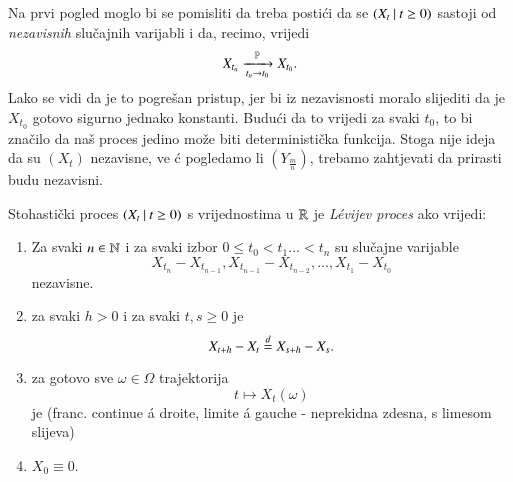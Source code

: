\begin{nap} \label{nap:21.2}
    Na prvi pogled moglo bi se pomisliti da treba posti\' ci da se $({X_t} \: | \: {t \geq 0})$ sastoji od \emph{nezavisnih} slu\v cajnih varijabli i da, recimo, vrijedi
    \begin{equation*}
        X_{t_n} \xrightarrow[t_n \to t_0]{\mathbb{P}} X_{t_0}.
    \end{equation*}
    Lako se vidi da je to pogre\v san pristup, jer bi iz nezavisnosti moralo slijediti da je $X_{t_0}$ gotovo sigurno jednako konstanti.
    Budu\' ci da to vrijedi za svaki $t_0$, to bi zna\v cilo da na\v s proces jedino mo\v ze biti deterministi\v cka funkcija.
    Stoga nije ideja da su $(X_t)$ nezavisne, ve \' c pogledamo li $(Y_{\frac{m}{n}})$, trebamo zahtjevati da prirasti budu nezavisni.
\end{nap}

\begin{defn}    \label{defn:21.3}
    Stohasti\v cki proces $({X_t} \: | \: {t \geq 0})$ s vrijednostima u $\mathbb{R}$ je \emph{L\' evijev proces} ako vrijedi:
    \begin{enumerate}[label=(\alph*)]
        \item   \label{defn:21.3.1}
        Za svaki $n \in \mathbb{N}$ i za svaki izbor $0 \leq t_0 < t_1 \ldots < t_n$ su slu\v cajne varijable
        \begin{equation*}
            X_{t_n} - X_{t_{n - 1}}, X_{t_{n - 1}} - X_{t_{n - 2}}, \ldots, X_{t_1} - X_{t_0}
        \end{equation*}
        nezavisne.
        \item   \label{defn:21.3.2}
        za svaki $h > 0$ i za svaki $t, s \geq 0$ je
        \begin{equation*}
            X_{t + h} - X_t \overset{d}{=} X_{s + h} - X_s.
        \end{equation*}
        \item   \label{defn:21.3.3}
        za gotovo sve $\omega \in \Omega$ trajektorija
        \begin{equation*}
            t \mapsto X_t (\omega)
        \end{equation*}
        je \cadlag  \: (franc. continue \' a droite, limite \' a gauche - neprekidna zdesna, s limesom slijeva)
        \item   \label{defn:21.3.4}
        $X_0 \equiv 0$.
    \end{enumerate}
\end{defn}

